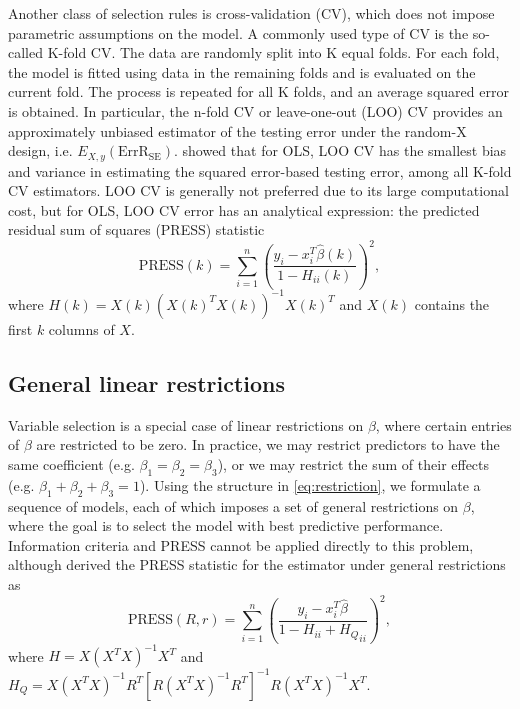 Another class of selection rules is cross-validation (CV), which does not impose parametric assumptions on the model. A commonly used type of CV is the so-called K-fold CV. The data are randomly split into K equal folds. For each fold, the model is fitted using data in the remaining folds and is evaluated on the current fold. The process is repeated for all K folds, and an average squared error is obtained. In particular, the n-fold CV or leave-one-out (LOO) CV provides an approximately unbiased estimator of the testing error under the random-X design, i.e. $E_{X,y}(\text{ErrR}_\text{SE})$. \citet{burman1989comparative} showed that for OLS, LOO CV has the smallest bias and variance in estimating the squared error-based testing error, among all K-fold CV estimators. LOO CV is generally not preferred due to its large computational cost, but for OLS, LOO CV error has an analytical expression: the predicted residual sum of squares (PRESS) statistic \citep{allen1974relationship}
\begin{equation*}
\text{PRESS}(k) = \sum_{i=1}^n \left( \frac{y_i-x_i^T\hat\beta(k)}{1-H_{ii}(k)} \right)^2,
\end{equation*}
where $H(k) = X(k)(X(k)^T X(k))^{-1}X(k)^T$ and $X(k)$ contains the first $k$ columns of $X$. 

\subsection{General linear restrictions}
Variable selection is a special case of linear restrictions on $\beta$, where certain entries of $\beta$ are restricted to be zero. In practice, we may restrict predictors to have the same coefficient (e.g. $\beta_1=\beta_2=\beta_3$), or we may restrict the sum of their effects (e.g. $\beta_1+\beta_2+\beta_3=1$). Using the structure in \eqref{eq:restriction}, we formulate a sequence of models, each of which imposes a set of general restrictions on $\beta$, where the goal is to select the model with best predictive performance. Information criteria and PRESS cannot be applied directly to this problem, although \citet{tarpey2000note} derived the PRESS statistic for the estimator under general restrictions as
\begin{equation*}
\text{PRESS}(R,r) = \sum_{i=1}^n \left( \frac{y_i-x_i^T\hat\beta}{1-H_{ii}+{H_Q}_{ii}} \right)^2,
\end{equation*}
where $H=X(X^T X)^{-1} X^T$ and $H_Q = X (X^T X)^{-1} R^T \left[ R (X^T X)^{-1} R^T \right]^{-1} R (X^T X)^{-1} X^T$.  


